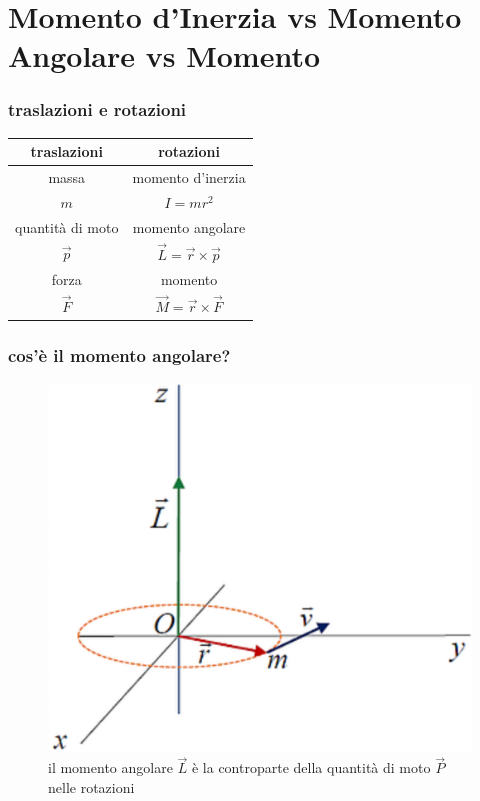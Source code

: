 \documentclass{beamer}
\begin{document}
\section{Momento d'Inerzia vs Momento Angolare vs Momento}
\begin{frame}
\frametitle{traslazioni e rotazioni}
\centering
\begin{tabular}{|c|c|} \hline
        traslazioni & rotazioni  \\ \hline
          massa & momento d'inerzia \\ 
        $m$ &  $I = m r^2$   \\ \hline
        quantità di moto & momento angolare \\
            $\vec{p}$ &  $\vec{L} = \vec{r} \times \vec{p}$   \\ \hline
            forza & momento \\
            $\vec{F}$ &  $\vec{M} = \vec{r} \times \vec{F}$  \\ \hline
      \end{tabular}
\end{frame}

\begin{frame}
\frametitle{cos'è il momento angolare?}
\begin{figure}
\includegraphics[scale=0.33]{./images/momentoangolare}
\caption{il momento angolare $\vec{L}$ è la controparte della quantità di moto $\vec{P}$ nelle rotazioni}
\end{figure}
\end{frame}
\end{document}

